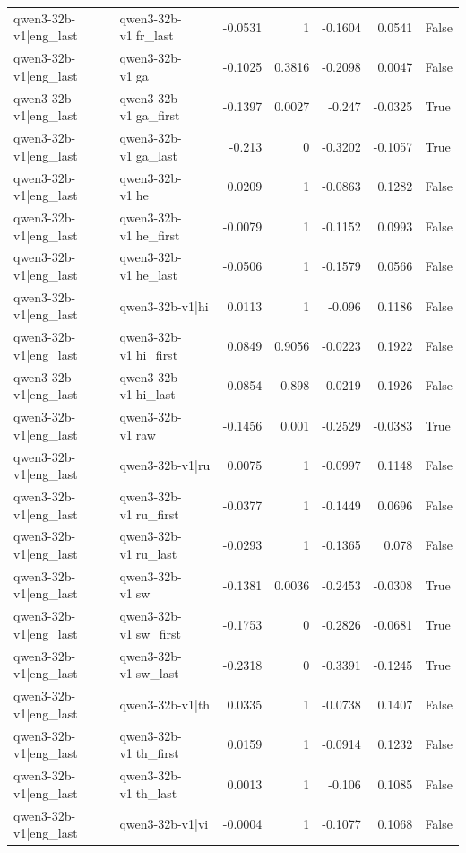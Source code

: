 \begin{table}
\begin{tabular}{l l r r r r l}
qwen3-32b-v1|eng_last & qwen3-32b-v1|fr_last & -0.0531 & 1 & -0.1604 & 0.0541 & False \\
qwen3-32b-v1|eng_last & qwen3-32b-v1|ga & -0.1025 & 0.3816 & -0.2098 & 0.0047 & False \\
qwen3-32b-v1|eng_last & qwen3-32b-v1|ga_first & -0.1397 & 0.0027 & -0.247 & -0.0325 & True \\
qwen3-32b-v1|eng_last & qwen3-32b-v1|ga_last & -0.213 & 0 & -0.3202 & -0.1057 & True \\
qwen3-32b-v1|eng_last & qwen3-32b-v1|he & 0.0209 & 1 & -0.0863 & 0.1282 & False \\
qwen3-32b-v1|eng_last & qwen3-32b-v1|he_first & -0.0079 & 1 & -0.1152 & 0.0993 & False \\
qwen3-32b-v1|eng_last & qwen3-32b-v1|he_last & -0.0506 & 1 & -0.1579 & 0.0566 & False \\
qwen3-32b-v1|eng_last & qwen3-32b-v1|hi & 0.0113 & 1 & -0.096 & 0.1186 & False \\
qwen3-32b-v1|eng_last & qwen3-32b-v1|hi_first & 0.0849 & 0.9056 & -0.0223 & 0.1922 & False \\
qwen3-32b-v1|eng_last & qwen3-32b-v1|hi_last & 0.0854 & 0.898 & -0.0219 & 0.1926 & False \\
qwen3-32b-v1|eng_last & qwen3-32b-v1|raw & -0.1456 & 0.001 & -0.2529 & -0.0383 & True \\
qwen3-32b-v1|eng_last & qwen3-32b-v1|ru & 0.0075 & 1 & -0.0997 & 0.1148 & False \\
qwen3-32b-v1|eng_last & qwen3-32b-v1|ru_first & -0.0377 & 1 & -0.1449 & 0.0696 & False \\
qwen3-32b-v1|eng_last & qwen3-32b-v1|ru_last & -0.0293 & 1 & -0.1365 & 0.078 & False \\
qwen3-32b-v1|eng_last & qwen3-32b-v1|sw & -0.1381 & 0.0036 & -0.2453 & -0.0308 & True \\
qwen3-32b-v1|eng_last & qwen3-32b-v1|sw_first & -0.1753 & 0 & -0.2826 & -0.0681 & True \\
qwen3-32b-v1|eng_last & qwen3-32b-v1|sw_last & -0.2318 & 0 & -0.3391 & -0.1245 & True \\
qwen3-32b-v1|eng_last & qwen3-32b-v1|th & 0.0335 & 1 & -0.0738 & 0.1407 & False \\
qwen3-32b-v1|eng_last & qwen3-32b-v1|th_first & 0.0159 & 1 & -0.0914 & 0.1232 & False \\
qwen3-32b-v1|eng_last & qwen3-32b-v1|th_last & 0.0013 & 1 & -0.106 & 0.1085 & False \\
qwen3-32b-v1|eng_last & qwen3-32b-v1|vi & -0.0004 & 1 & -0.1077 & 0.1068 & False \\

\end{tabular}
\end{table}
